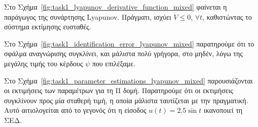 \documentclass[a4paper,12pt]{article}
\begin{document}
Στο Σχήμα~\ref{fig:task1_lyapunov_derivative_function_mixed} φαίνεται η παράγωγος της συνάρτησης 
Lyapunov. Πράγματι, ισχύει 
$\dot{V} \leq 0, \, \forall t$, καθιστώντας το σύστημα εκτίμησης ευσταθές.

Στο Σχήμα~\ref{fig:task1_identification_error_lyapunov_mixed} παρατηρούμε ότι το σφάλμα αναγνώρισης
συγκλίνει, και μάλιστα πολύ γρήγορα, στο μηδέν, λόγω της μεγάλης τιμής του κέρδους $\psi$ που επιλέξαμε.

Στο Σχήμα~\ref{fig:task1_parameter_estimations_lyapunov_mixed} παρουσιάζονται οι εκτιμήσεις των παραμέτρων
για τη Π δομή. Παρατηρούμε ότι οι εκτιμήσεις συγκλίνουν προς μία σταθερή τιμή, η οποία μάλιστα ταυτίζεται με
την πραγματική. Αυτό αιτιολογείται από το γεγονός ότι η είσοδος $u(t) = 2.5 \sin t$ ικανοποιεί τη ΣΕΔ.
\end{document}
